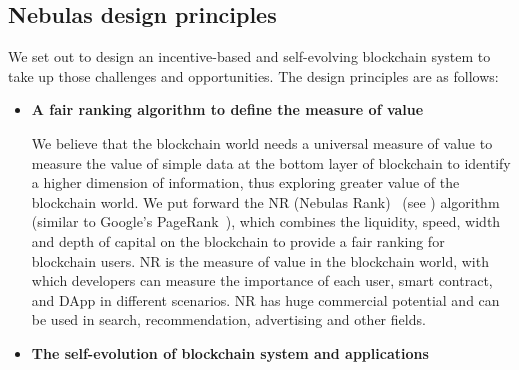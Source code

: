 \subsection{Nebulas design principles}
We set out to design an incentive-based and self-evolving blockchain system to take up those challenges and opportunities. The design principles are as follows:
\begin{itemize}
	\item \textbf{A fair ranking algorithm to define the measure of value}

We believe that the blockchain world needs a universal measure of value to measure the value of simple data at the bottom layer of blockchain to identify a higher dimension of information, thus exploring greater value of the blockchain world. We put forward the NR (Nebulas Rank) ~(see ) algorithm (similar to Google's PageRank~\cite{Brin2010}\cite{page1999pagerank}), which combines the liquidity, speed, width and depth of capital on the blockchain to provide a fair ranking for blockchain users. NR is the measure of value in the blockchain world, with which developers can measure the importance of each user, smart contract, and DApp in different scenarios. NR has huge commercial potential and can be used in search, recommendation, advertising and other fields.

\item \textbf{The self-evolution of blockchain system and applications}


\end{itemize}
